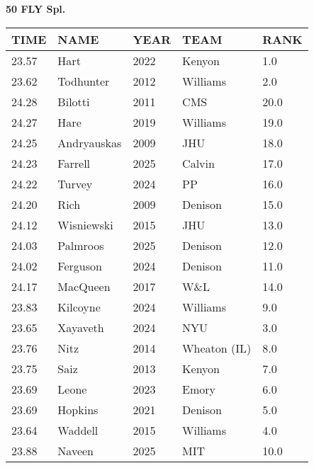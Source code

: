 \begin{center}
\begin{minipage}[t]{0.7\textwidth}
\centering
\textbf{50 FLY Spl.}\\[0.05cm]
\begin{tabular}{@{}p{1.8cm}p{2.8cm}p{1.2cm}p{1.4cm}p{0.8cm}@{}}
\hline
\textbf{TIME} & \textbf{NAME} & \textbf{YEAR} & \textbf{TEAM} & \textbf{RANK} \\
\hline
23.57 & Hart & 2022 & Kenyon & 1.0 \\
23.62 & Todhunter & 2012 & Williams & 2.0 \\
24.28 & Bilotti & 2011 & CMS & 20.0 \\
24.27 & Hare & 2019 & Williams & 19.0 \\
24.25 & Andryauskas & 2009 & JHU & 18.0 \\
24.23 & Farrell & 2025 & Calvin & 17.0 \\
24.22 & Turvey & 2024 & PP & 16.0 \\
24.20 & Rich & 2009 & Denison & 15.0 \\
24.12 & Wisniewski & 2015 & JHU & 13.0 \\
24.03 & Palmroos & 2025 & Denison & 12.0 \\
24.02 & Ferguson & 2024 & Denison & 11.0 \\
24.17 & MacQueen & 2017 & W\&L & 14.0 \\
23.83 & Kilcoyne & 2024 & Williams & 9.0 \\
23.65 & Xayaveth & 2024 & NYU & 3.0 \\
23.76 & Nitz & 2014 & Wheaton (IL) & 8.0 \\
23.75 & Saiz & 2013 & Kenyon & 7.0 \\
23.69 & Leone & 2023 & Emory & 6.0 \\
23.69 & Hopkins & 2021 & Denison & 5.0 \\
23.64 & Waddell & 2015 & Williams & 4.0 \\
23.88 & Naveen & 2025 & MIT & 10.0 \\
\hline
\end{tabular}
\end{minipage}
\end{center}

\vspace{0.4cm}

